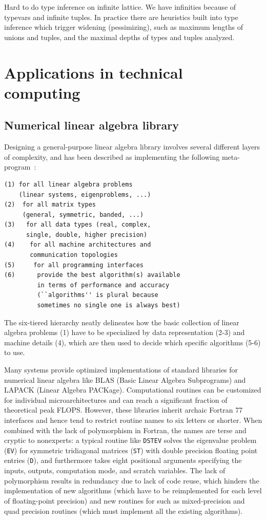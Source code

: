 \documentclass[pldi]{sigplanconf-pldi15}
\begin{document}
Hard to do type inference on infinite lattice. We have infinities because of
typevars and infinite tuples.  In practice there are heuristics built into type
inference which trigger widening (pessimizing), such as maximum lengths of
unions and tuples, and the maximal depths of types and tuples analyzed.

\section{Applications in technical computing}


\subsection{Numerical linear algebra library}

Designing a general-purpose linear algebra library involves several different
layers of complexity, and has been described as implementing the following
meta-program~\cite{Demmel2007}:

{\small
\begin{verbatim}
(1) for all linear algebra problems
    (linear systems, eigenproblems, ...)
(2)  for all matrix types
     (general, symmetric, banded, ...)
(3)   for all data types (real, complex,
      single, double, higher precision)
(4)    for all machine architectures and
       communication topologies
(5)     for all programming interfaces
(6)      provide the best algorithm(s) available
         in terms of performance and accuracy
         (``algorithms'' is plural because
         sometimes no single one is always best)
\end{verbatim}
}
%
The six-tiered hierarchy neatly delineates how the basic collection of linear
algebra problems (1) have to be specialized by data representation (2-3) and
machine details (4), which are then used to decide which specific algorithms
(5-6) to use.

Many systems provide optimized implementations of standard libraries for
numerical linear algebra like BLAS (Basic Linear Algebra Subprograms) and
LAPACK (Linear Algebra PACKage). Computational routines can be customized
for individual microarchitectures and can reach a significant fraction of
theoretical peak FLOPS. However, these libraries inherit archaic Fortran 77
interfaces and hence tend to restrict routine names to six letters or shorter.
When combined with the lack of polymorphism in Fortran, the names are terse and
cryptic to nonexperts: a typical routine like \verb|DSTEV| solves the
eigenvalue problem (\verb|EV|) for symmetric tridiagonal matrices (\verb|ST|)
with double precision floating point entries (\verb|D|), and furthermore takes
eight positional arguments specifying the inputs, outputs, computation mode,
and scratch variables. The lack of polymorphism results in redundancy due to
lack of code reuse, which hinders the implementation of new algorithms (which
have to be reimplemented for each level of floating-point precision) and new
routines for such as mixed-precision and quad precision routines (which must
implement all the existing algorithms).
\end{document}
